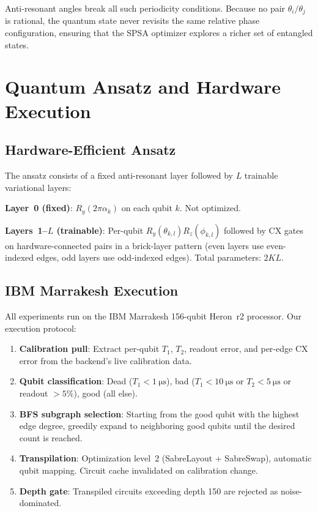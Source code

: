 \documentclass[twocolumn,showpacs,preprintnumbers,amsmath,amssymb,aps,prl]{revtex4-2}
\begin{document}
Anti-resonant angles break all such periodicity conditions. Because no pair $\theta_i/\theta_j$ is rational, the quantum state never revisits the same relative phase configuration, ensuring that the SPSA optimizer explores a richer set of entangled states.


\section{Quantum Ansatz and Hardware Execution}
\label{sec:ansatz}

\subsection{Hardware-Efficient Ansatz}

The ansatz consists of a fixed anti-resonant layer followed by $L$ trainable variational layers:

\textbf{Layer~0 (fixed)}: $R_y(2\pi\alpha_k)$ on each qubit $k$. Not optimized.

\textbf{Layers~1--$L$ (trainable)}: Per-qubit $R_y(\theta_{k,l})R_z(\phi_{k,l})$ followed by CX gates on hardware-connected pairs in a brick-layer pattern (even layers use even-indexed edges, odd layers use odd-indexed edges). Total parameters: $2KL$.

\subsection{IBM Marrakesh Execution}

All experiments run on the IBM Marrakesh 156-qubit Heron~r2 processor. Our execution protocol:

\begin{enumerate}
    \item \textbf{Calibration pull}: Extract per-qubit $T_1$, $T_2$, readout error, and per-edge CX error from the backend's live calibration data.
    \item \textbf{Qubit classification}: Dead ($T_1 < \SI{1}{\micro\second}$), bad ($T_1 < \SI{10}{\micro\second}$ or $T_2 < \SI{5}{\micro\second}$ or readout $> 5\%$), good (all else).
    \item \textbf{BFS subgraph selection}: Starting from the good qubit with the highest edge degree, greedily expand to neighboring good qubits until the desired count is reached.
    \item \textbf{Transpilation}: Optimization level~2 (SabreLayout + SabreSwap), automatic qubit mapping. Circuit cache invalidated on calibration change.
    \item \textbf{Depth gate}: Transpiled circuits exceeding depth 150 are rejected as noise-dominated.
\end{enumerate}
\end{document}

